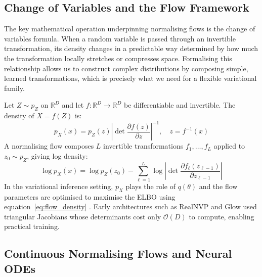    \subsection{Change of Variables and the Flow Framework}

    The key mathematical operation underpinning normalising flows is the change of variables formula. When a random variable is passed through an invertible transformation, its density changes in a predictable way determined by how much the transformation locally stretches or compresses space. Formalising this relationship allows us to construct complex distributions by composing simple, learned transformations, which is precisely what we need for a flexible variational family.

    Let $Z \sim p_Z$ on $\mathbb{R}^D$ and let $f : \mathbb{R}^D \to \mathbb{R}^D$ be differentiable and invertible. The density of $X = f(Z)$ is:
    \begin{equation}
        p_X(x) = p_Z(z) \left| \det \frac{\partial f(z)}{\partial z} \right|^{-1}, \quad z = f^{-1}(x)
        \label{eq:cov}
    \end{equation}
    A normalising flow composes $L$ invertible transformations $f_1, \ldots, f_L$ applied to $z_0 \sim p_Z$, giving log density:
    \begin{equation}
        \log p_X(x) = \log p_Z(z_0) - \sum_{\ell=1}^L \log \left| \det \frac{\partial f_\ell(z_{\ell-1})}{\partial z_{\ell-1}} \right|
        \label{eq:flow_density}
    \end{equation}
    In the variational inference setting, $p_X$ plays the role of $q(\theta)$ and the flow parameters are optimised to maximise the ELBO using equation~\eqref{eq:flow_density} \citep{rezende2015}. Early architectures such as RealNVP \citep{dinh2017} and Glow \citep{kingma2018} used triangular Jacobians whose determinants cost only $\mathcal{O}(D)$ to compute, enabling practical training.

    \subsection{Continuous Normalising Flows and Neural ODEs}

